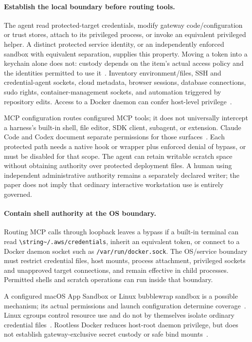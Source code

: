 \paragraph{Establish the local boundary before routing tools.}
The agent  read protected-target credentials, modify gateway code/configuration or trust stores, attach to its privileged process, or invoke an equivalent privileged helper. A distinct protected service identity, or an independently enforced sandbox with equivalent separation, supplies this property. Moving a token into a keychain alone does not: custody depends on the item's actual access policy and the identities permitted to use it~\cite{applekeychain2026}. Inventory environment/files, SSH and credential-agent sockets, cloud metadata, browser sessions, database connections, sudo rights, container-management sockets, and automation triggered by repository edits. Access to a Docker daemon can confer host-level privilege~\cite{dockersecurity2026}.

MCP configuration routes configured MCP tools; it does not universally intercept a harness's built-in shell, file editor, SDK client, subagent, or extension. Claude Code and Codex document separate permissions for those surfaces~\cite{claudecodepermissions2026,codexpermissions2026}. Each protected path needs a native hook or wrapper plus enforced denial of bypass, or must be disabled for that scope. The agent can retain writable scratch space without obtaining authority over protected deployment files. A human using independent administrative authority remains a separately declared writer; the paper does not imply that ordinary interactive workstation use is entirely governed.

\paragraph{Contain shell authority at the OS boundary.}
Routing MCP calls through loopback leaves a bypass if a built-in terminal can read \nolinkurl{\string~/.aws/credentials}, inherit an equivalent token, or connect to a Docker daemon socket such as \nolinkurl{/var/run/docker.sock}. The OS/service boundary must restrict credential files, host mounts, process attachment, privileged sockets and unapproved target connections, and remain effective in child processes. Permitted shells and scratch operations can run inside that boundary.

A configured macOS App Sandbox or Linux bubblewrap sandbox is a possible mechanism; its actual permissions and launch configuration determine coverage~\cite{appleappsandbox2026,bubblewrapsecurity2026}. Linux cgroups control resource use and do not by themselves isolate ordinary credential files~\cite{linuxcgroup2026}. Rootless Docker reduces host-root daemon privilege, but does not establish gateway-exclusive secret custody or safe bind mounts~\cite{dockerrootless2026,dockerbindmounts2026}.


